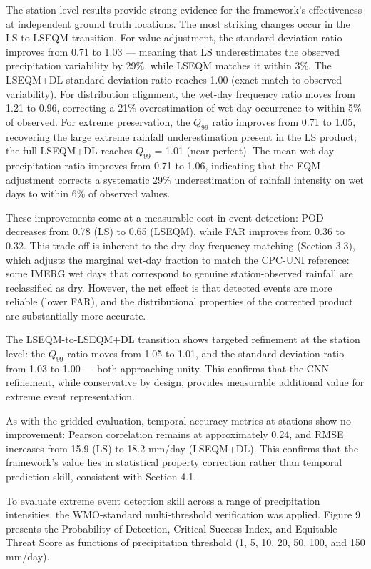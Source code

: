 \documentclass[
]{article}
\begin{document}
The station-level results provide strong evidence for the framework's
effectiveness at independent ground truth locations. The most striking
changes occur in the LS-to-LSEQM transition. For value adjustment, the
standard deviation ratio improves from 0.71 to 1.03 --- meaning that LS
underestimates the observed precipitation variability by 29\%, while
LSEQM matches it within 3\%. The LSEQM+DL standard deviation ratio
reaches 1.00 (exact match to observed variability). For distribution
alignment, the wet-day frequency ratio moves from 1.21 to 0.96,
correcting a 21\% overestimation of wet-day occurrence to within 5\% of
observed. For extreme preservation, the \(Q_{99}\) ratio improves from
0.71 to 1.05, recovering the large extreme rainfall underestimation
present in the LS product; the full LSEQM+DL reaches \(Q_{99}\) = 1.01
(near perfect). The mean wet-day precipitation ratio improves from 0.71
to 1.06, indicating that the EQM adjustment corrects a systematic 29\%
underestimation of rainfall intensity on wet days to within 6\% of
observed values.

These improvements come at a measurable cost in event detection: POD
decreases from 0.78 (LS) to 0.65 (LSEQM), while FAR improves from 0.36
to 0.32. This trade-off is inherent to the dry-day frequency matching
\cite{ref11} (Section 3.3), which adjusts the marginal wet-day fraction to
match the CPC-UNI reference: some IMERG wet days that correspond to
genuine station-observed rainfall are reclassified as dry. However, the
net effect is that detected events are more reliable (lower FAR), and
the distributional properties of the corrected product are substantially
more accurate.

The LSEQM-to-LSEQM+DL transition shows targeted refinement at the
station level: the \(Q_{99}\) ratio moves from 1.05 to 1.01, and the
standard deviation ratio from 1.03 to 1.00 --- both approaching unity.
This confirms that the CNN refinement, while conservative by design,
provides measurable additional value for extreme event representation.

As with the gridded evaluation, temporal accuracy metrics at stations
show no improvement: Pearson correlation remains at approximately 0.24,
and RMSE increases from 15.9 (LS) to 18.2 mm/day (LSEQM+DL). This
confirms that the framework's value lies in statistical property
correction rather than temporal prediction skill, consistent with
Section 4.1.

To evaluate extreme event detection skill across a range of
precipitation intensities, the WMO-standard multi-threshold verification
\cite{ref24} was applied. Figure 9 presents the Probability of Detection,
Critical Success Index, and Equitable Threat Score as functions of
precipitation threshold (1, 5, 10, 20, 50, 100, and 150 mm/day).
\end{document}
